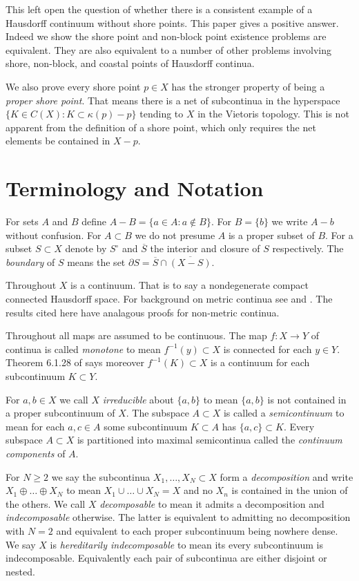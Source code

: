 \documentclass[12pt]{article}
\theoremstyle{plain}
\theoremstyle{definition}
\newcommand{\K}{\ensuremath{\kappa}}
\newcommand{\0}{\ensuremath{\varnothing}}
\newcommand{\DD}{\ensuremath{\partial}}
\begin{document}
This left open the question of whether there is a consistent example of a Hausdorff continuum without shore points.
This paper gives a positive answer.
Indeed we show the shore point and non-block point existence problems are equivalent.
They are also equivalent to a number of other problems involving shore, non-block, and coastal points of Hausdorff continua.

We also prove every shore point $p \in X$ has the stronger property of being a \textit{proper shore point}.
That means there is a net of subcontinua in the hyperspace $\{K \in C(X): K \subset \K(p) - p\}$ tending to $X$ in the Vietoris topology.
This is not apparent from the definition of a shore point, which only requires the net elements be contained in $X-p$.

\section{Terminology and Notation}

\noindent For sets $A$ and $B$ define $A - B = \{ a \in A \colon a \notin B\}$. 
For $B = \{b\}$ we write $A-b$ without confusion. 
For $A \subset B$ we do not presume $A$ is a proper subset of $B$.
For a subset $S \subset X$ denote by $S^\circ$ and $\overline S$ the interior and closure of $S$ respectively. 
The \textit{boundary} of $S$ means the set $\DD S = \overline S \cap \overline{(X-S)}$.

Throughout $X$ is a continuum. 
That is to say a nondegenerate compact connected Hausdorff space.
For background on metric continua see \cite{kur2} and \cite{nadlerbook}.
The results cited here have analagous proofs for non-metric continua.


Throughout all maps are assumed to be continuous.
The map $f:X \to Y$ of continua is called \textit{monotone} to mean $f^{-1}(y) \subset X$ is connected for each $y \in Y$.
Theorem 6.1.28 of \cite{Engelking} says moreover $f^{-1}(K) \subset X$ is a continuum for each subcontinuum $K \subset Y$.


For $a,b \in X$ we call $X$ \textit{irreducible} about $\{a,b\}$ to mean $\{a,b\}$ is not contained in a proper subcontinuum of $X$.
The subspace $A \subset X$ is called a \textit{semicontinuum} to mean
for each $a,c \in A$ some subcontinuum $K \subset A$ has $\{a,c\} \subset K$.
Every subspace $A \subset X$ is partitioned into maximal semicontinua called the \textit{continuum components} of $A$.

For $N\ge 2$ we say the subcontinua $X_1, \ldots , X_N \subset X$ form a \textit{decomposition} 
and write $X_1  \oplus \ldots \oplus X_N$ to mean $X_1 \cup \ldots \cup X_N =X$
and no $X_n$ is contained in the union of the others.
We call $X$ \textit{decomposable} to mean it admits a decomposition and \textit{indecomposable} otherwise.
The latter is equivalent to admitting no decomposition with $N=2$ 
and equivalent to each proper subcontinuum being nowhere dense.
We say $X$ is \textit{hereditarily indecomposable} to mean its every subcontinuum is indecomposable.
Equivalently each pair of subcontinua are either disjoint or nested.
\end{document}
